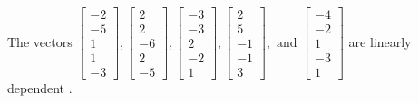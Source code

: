 \begin{exercise}
\begin{exerciseStatement}
  \end{exerciseStatement}
  \begin{exerciseAnswer}
   The vectors \(\left[\begin{array}{r}
-2 \\
-5 \\
1 \\
1 \\
-3
\end{array}\right] , \left[\begin{array}{r}
2 \\
2 \\
-6 \\
2 \\
-5
\end{array}\right] , \left[\begin{array}{r}
-3 \\
-3 \\
2 \\
-2 \\
1
\end{array}\right] , \left[\begin{array}{r}
2 \\
5 \\
-1 \\
-1 \\
3
\end{array}\right] , \text{ and } \left[\begin{array}{r}
-4 \\
-2 \\
1 \\
-3 \\
1
\end{array}\right]\) are 
  	 linearly dependent  .
  


  \end{exerciseAnswer}
\end{exercise}